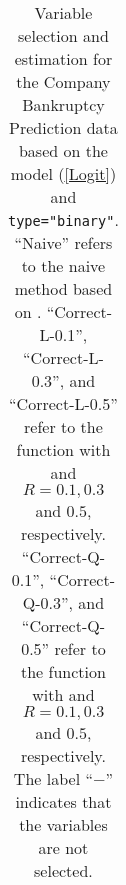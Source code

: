 



\begin{table}[!ht]

       \huge
     \caption{Variable selection and estimation for the Company Bankruptcy Prediction data based on the model (\ref{Logit}) and \texttt{type="binary"}. ``Naive'' refers to the naive method based on . ``Correct-L-0.1'', ``Correct-L-0.3'', and ``Correct-L-0.5'' refer to the function  with  and $R=0.1,0.3$ and $0.5$, respectively. ``Correct-Q-0.1'', ``Correct-Q-0.3'', and ``Correct-Q-0.5'' refer to the function  with  and $R=0.1,0.3$ and $0.5$, respectively. {The label ``$-$'' indicates that the variables are not selected.} } \label{rda}


 \scriptsize

\center
 \renewcommand{\arraystretch}{1.2}

\begin{tabular}{ccccccccccccccccccccccc}
\hline


\end{tabular}
\end{table}
